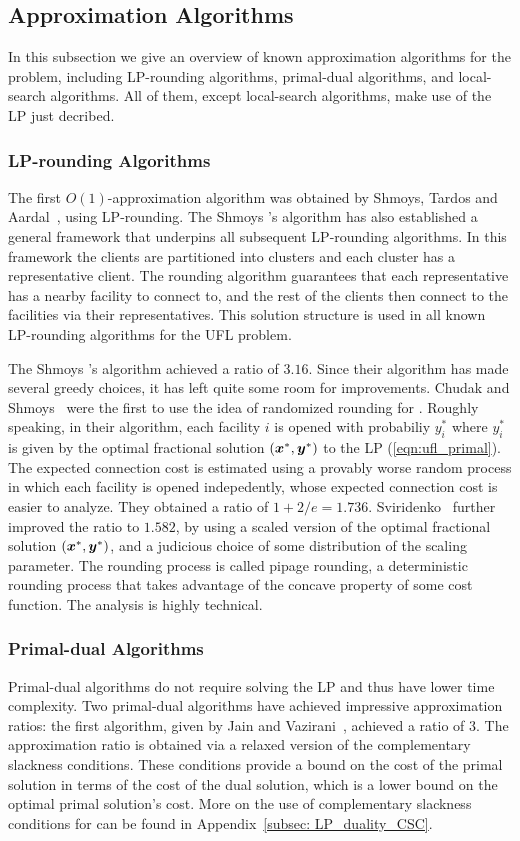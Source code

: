 \documentclass[oneside,final]{ucr}
\begin{document}
\subsection{Approximation Algorithms}
In this subsection we give an overview of known
approximation algorithms for the {\UFL} problem, including
LP-rounding algorithms, primal-dual algorithms, and
local-search algorithms. All of them, except local-search
algorithms, make use of the LP just decribed.

\subsubsection{LP-rounding Algorithms}
The first $O(1)$-approximation algorithm was obtained by
Shmoys, Tardos and Aardal~\cite{ShmoysTA97}, using
LP-rounding. The Shmoys {\etal}'s algorithm has also
established a general framework that underpins all
subsequent LP-rounding algorithms. In this framework the
clients are partitioned into clusters and each cluster has
a representative client. The rounding algorithm guarantees
that each representative has a nearby facility to connect
to, and the rest of the clients then connect to the
facilities via their representatives. This solution
structure is used in all known LP-rounding algorithms for
the UFL problem.

The Shmoys {\etal}'s algorithm achieved a ratio of
$3.16$. Since their algorithm has made several greedy
choices, it has left quite some room for
improvements. Chudak and Shmoys~\cite{ChudakS04} were the
first to use the idea of randomized rounding for
{\UFL}. Roughly speaking, in their algorithm, each facility
$i$ is opened with probabiliy $y_i^\ast$ where $y_i^\ast$ is
given by the optimal fractional solution
$(\boldsymbol{x}^\ast,\boldsymbol{y}^\ast)$ to the LP
(\ref{eqn:ufl_primal}). The expected connection cost is
estimated using a provably worse random process in which
each facility is opened indepedently, whose expected
connection cost is easier to analyze. They obtained a ratio
of $1+2/e = 1.736$. Sviridenko~\cite{Svi02} further improved
the ratio to $1.582$, by using a scaled version of the
optimal fractional solution $(\boldsymbol{x}^\ast,\boldsymbol{y}^\ast)$, and a
judicious choice of some distribution of the scaling
parameter. The rounding process is called pipage rounding, a
deterministic rounding process that takes advantage of the
concave property of some cost function. The analysis is
highly technical.

\subsubsection{Primal-dual Algorithms}
Primal-dual algorithms do not require solving the LP and
thus have lower time complexity. Two primal-dual algorithms
have achieved impressive approximation ratios: the first
algorithm, given by Jain and Vazirani~\cite{JainV01},
achieved a ratio of $3$. The approximation ratio is obtained
via a relaxed version of the complementary slackness
conditions. These conditions provide a bound on the cost of
the primal solution in terms of the cost of the dual
solution, which is a lower bound on the optimal primal
solution's cost. More on the use of complementary slackness
conditions for {\UFL} can be found in Appendix~\ref{subsec:
  LP_duality_CSC}.
\end{document}

